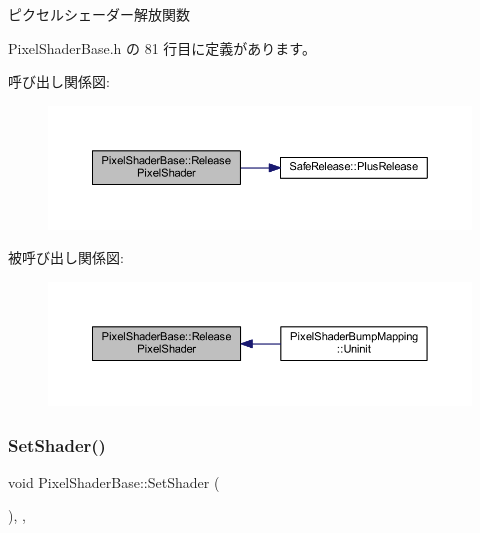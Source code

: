 ピクセルシェーダー解放関数 



 Pixel\+Shader\+Base.\+h の 81 行目に定義があります。

呼び出し関係図\+:\nopagebreak
\begin{figure}[H]
\begin{center}
\leavevmode
\includegraphics[width=350pt]{class_pixel_shader_base_a8e00c19f5ece0a08762442f355195591_cgraph}
\end{center}
\end{figure}
被呼び出し関係図\+:\nopagebreak
\begin{figure}[H]
\begin{center}
\leavevmode
\includegraphics[width=350pt]{class_pixel_shader_base_a8e00c19f5ece0a08762442f355195591_icgraph}
\end{center}
\end{figure}
\mbox{\label{class_pixel_shader_base_a73f41bda5cbb9309ad415cdc471954a2}} 
\subsubsection{\texorpdfstring{Set\+Shader()}{SetShader()}}
{\footnotesize\ttfamily void Pixel\+Shader\+Base\+::\+Set\+Shader (\begin{DoxyParamCaption}{ }\end{DoxyParamCaption})\hspace{0.3cm}{\ttfamily [inline]}, {\ttfamily [override]}, {\ttfamily [virtual]}}



